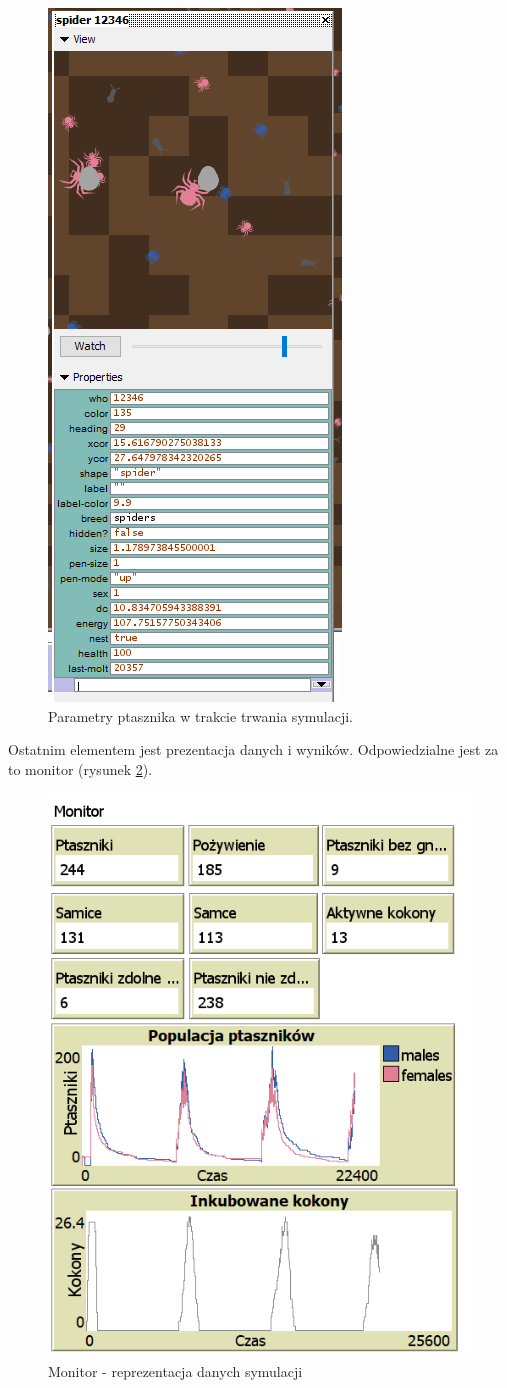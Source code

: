 \documentclass[a4paper,11pt,titlepage]{article}
\begin{document}
\begin{figure}[H]
\centering
\includegraphics[width=.5\columnwidth]{img/spider-params.PNG}
\caption{Parametry ptasznika w trakcie trwania symulacji.}
\label{fig:8}
\end{figure}


Ostatnim elementem jest prezentacja danych i wyników. Odpowiedzialne jest za to monitor (rysunek \ref{fig:2}). 
\begin{figure}[H]
\centering
\includegraphics[width=.5\columnwidth]{img/monitor.PNG}
\caption{Monitor - reprezentacja danych symulacji}
\label{fig:2}
\end{figure}
\end{document}
